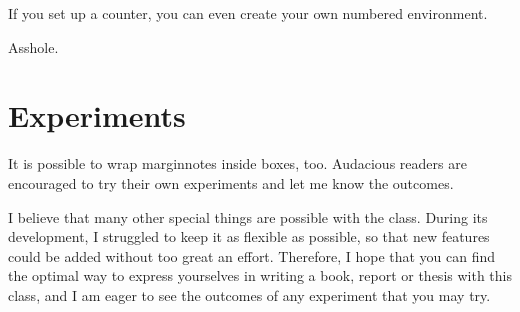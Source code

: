 \begin{kaobox}[frametitle=Title of the box]
\blindtext
\end{kaobox}

If you set up a counter, you can even create your own numbered 
environment.

\begin{kaocounter}
	Asshole.
\end{kaocounter}

\section{Experiments}

It is possible to wrap marginnotes inside boxes, too. Audacious readers 
are encouraged to try their own experiments and let me know the 
outcomes.


I believe that many other special things are possible with the 
 class. During its development, I struggled to keep it as 
flexible as possible, so that new features could be added without too 
great an effort. Therefore, I hope that you can find the optimal way to 
express yourselves in writing a book, report or thesis with this class, 
and I am eager to see the outcomes of any experiment that you may try.

